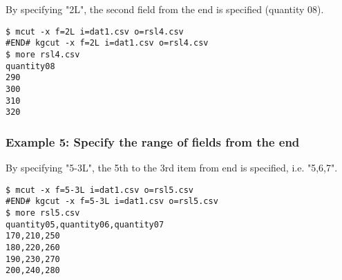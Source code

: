 By specifying "2L", the second field from the end is specified (quantity 08).


\begin{Verbatim}[baselinestretch=0.7,frame=single]
$ mcut -x f=2L i=dat1.csv o=rsl4.csv
#END# kgcut -x f=2L i=dat1.csv o=rsl4.csv
$ more rsl4.csv
quantity08
290
300
310
320
\end{Verbatim}
\subsubsection*{Example 5: Specify the range of fields from the end}

By specifying "5-3L", the 5th to the 3rd item from end is specified, i.e. "5,6,7".


\begin{Verbatim}[baselinestretch=0.7,frame=single]
$ mcut -x f=5-3L i=dat1.csv o=rsl5.csv
#END# kgcut -x f=5-3L i=dat1.csv o=rsl5.csv
$ more rsl5.csv
quantity05,quantity06,quantity07
170,210,250
180,220,260
190,230,270
200,240,280
\end{Verbatim}
